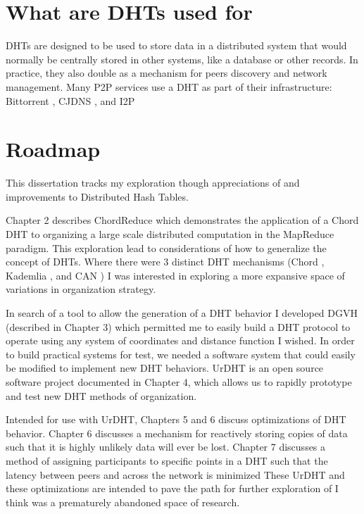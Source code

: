 \section{What are DHTs used for}

DHTs are designed to be used to store data in a distributed system that would normally be centrally stored in other systems, like a database or other records.
In practice, they also double as a mechanism for peers discovery and network management.
Many P2P services use a DHT as part of their infrastructure: Bittorrent \cite{jimenez2011kademlia}, CJDNS \cite{hodson2013meshnet}, and I2P \cite{zantout2011i2p}

\section{Roadmap}

This dissertation tracks my exploration though appreciations of and improvements to Distributed Hash Tables.

Chapter 2 describes ChordReduce \cite{chordreduce} which demonstrates the application of a Chord DHT to organizing a large scale distributed computation in the MapReduce \cite{mapreduce} paradigm.
This exploration lead to considerations of how to generalize the concept of DHTs.
Where there were 3 distinct DHT mechanisms (Chord \cite{chord}, Kademlia \cite{kademlia}, and CAN \cite{can}) I was interested in exploring a more expansive space of variations in organization strategy.

In search of a tool to allow the generation of a DHT behavior I developed DGVH \cite{DGVH} (described in Chapter 3) which permitted me to easily build a DHT protocol to operate using any system of coordinates and distance function I wished.
In order to build practical systems for test, we needed a software system that could easily be modified to implement new DHT behaviors.
UrDHT \cite{urdht} is an open source software project documented in Chapter 4, which allows us to rapidly prototype and test new DHT methods of organization.

Intended for use with UrDHT, Chapters 5 and 6 discuss optimizations of DHT behavior.
Chapter 6 discusses a mechanism for reactively storing copies of data such that it is highly unlikely data will ever be lost.
Chapter 7 discusses a method of assigning participants to specific points in a DHT such that the latency between peers and across the network is minimized  
These UrDHT and these optimizations are intended to pave the path for further exploration of I think was a prematurely abandoned space of research.

